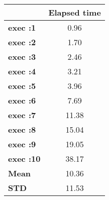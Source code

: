 \begin{tiny}\begin{tabular}{|l|c|}
\hline
&\textbf{Elapsed time}\\\hline
\textbf{exec :1}&0.96\\\hline
\textbf{exec :2}&1.70\\\hline
\textbf{exec :3}&2.46\\\hline
\textbf{exec :4}&3.21\\\hline
\textbf{exec :5}&3.96\\\hline
\textbf{exec :6}&7.69\\\hline
\textbf{exec :7}&11.38\\\hline
\textbf{exec :8}&15.04\\\hline
\textbf{exec :9}&19.05\\\hline
\textbf{exec :10}&38.17\\\hline
\textbf{ Mean}&10.36\\\hline
\textbf{ STD}&11.53\\\hline
\end{tabular}
\end{tiny}